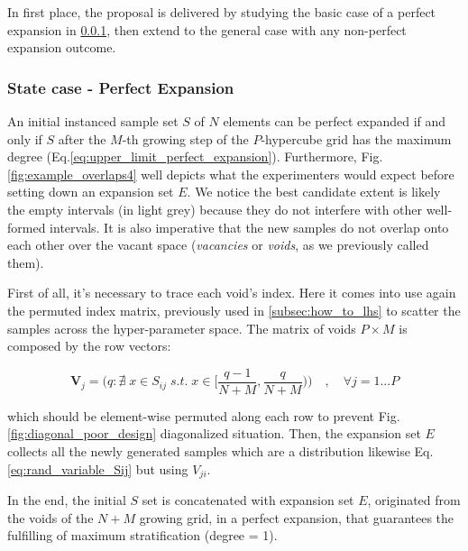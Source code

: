 \documentclass[12pt]{extarticle}
\newcommand{\meqref}[1]{Eq.\ref{#1}}
\newcommand{\mfigref}[1]{Fig.\ref{#1}}
\begin{document}
In first place, the proposal is delivered by studying the basic case of a perfect expansion in \cref{subsubsec:perfect_expansion_case}, then extend to the general case with any non-perfect expansion outcome.

\subsubsection{State case - Perfect Expansion}
\label{subsubsec:perfect_expansion_case}
An initial instanced sample set $S$ of $N$ elements can be perfect expanded if and only if $S$ after the $M$-th growing step of the $P$-hypercube grid has the maximum degree (\meqref{eq:upper_limit_perfect_expansion}). Furthermore, \mfigref{fig:example_overlaps4} well depicts what the experimenters would expect before setting down an expansion set $E$. We notice the best candidate extent is likely the empty intervals (in light grey) because they do not interfere with other well-formed intervals. It is also imperative that the new samples do not overlap onto each other over the vacant space (\textit{vacancies} or \textit{voids}, as we previously called them).

First of all, it's necessary to trace each void's index. Here it comes into use again the permuted index matrix, previously used in \cref{subsec:how_to_lhs} to scatter the samples across the hyper-parameter space. The matrix of voids $P \times M$ is composed by the row vectors: 

\begin{equation}
\label{eq:voids_matrix}
\textbf{V}_j = \bigg( q : \nexists\; x \in S_{ij} \; s.t. \; x \in \Big[\frac{q-1}{N+M}, \frac{q}{N+M}\Big) \bigg) \quad, \quad \forall j = 1...P
\end{equation}

which should be element-wise permuted along each row to prevent \mfigref{fig:diagonal_poor_design} diagonalized situation.
Then, the expansion set $E$ collects all the newly generated samples which are a distribution likewise \meqref{eq:rand_variable_Sij} but using $V_{ji}$. 

In the end, the initial $S$ set is concatenated with expansion set $E$, originated from the voids of the $N+M$ growing grid, in a perfect expansion, that guarantees the fulfilling of maximum stratification (degree = 1). 
\end{document}
